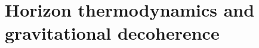 \newcommand{\authorhold}[1]{\par\smallskip\noindent\fbox{\parbox{0.95\linewidth}{\small\textbf{Author hold.} #1}}\par\smallskip}

\chapter{Horizon thermodynamics and gravitational decoherence}\label{ch:theory}

